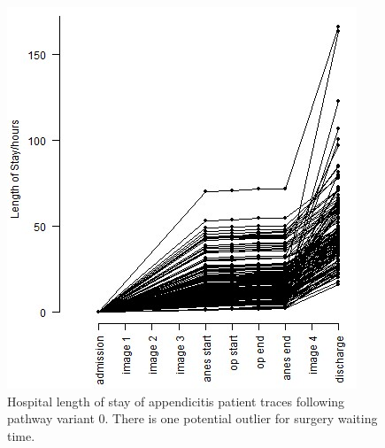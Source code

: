\begin{figure}[t]
    \centering
    \begin{minipage}{0.48\textwidth}
        \centering
        \includegraphics[width=\textwidth]{images/appendicitis_variant_length_of_stay_0_journal.jpg}
        \caption{Hospital length of stay of appendicitis patient traces following pathway variant 0. There is one potential outlier for surgery waiting time.}
        \label{fig:appendicitis length of stay variant 0}
    \end{minipage}\hfill
    \begin{minipage}{0.48\textwidth}
        \centering

\end{minipage}
\end{figure}
